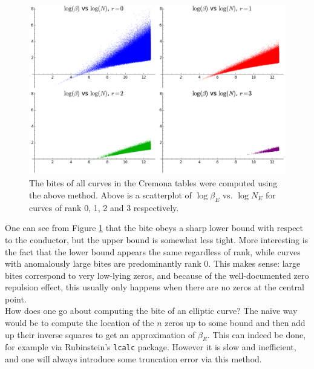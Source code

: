 \begin{figure}[!h]
    \centering
    \includegraphics[width=1.0\textwidth]{graphics/bites_vs_conductors_array.png}
    \caption{The bites of all curves in the Cremona tables were computed using the above method. Above is a scatterplot of $\log \beta_E $ vs. $\log N_E$ for curves of rank 0, 1, 2 and 3 respectively. }
    \label{fig:bites_vs_conductors_array}
\end{figure}

One can see from Figure \ref{fig:bites_vs_conductors_array} that the bite obeys a sharp lower bound with respect to the conductor, but the upper bound is somewhat less tight. More interesting is the fact that the lower bound appears the same regardless of rank, while curves with anomalously large bites are predominantly rank $0$. This makes sense: large bites correspond to very low-lying zeros, and because of the well-documented zero repulsion effect, this usually only happens when there are no zeros at the central point. \\

How does one go about computing the bite of an elliptic curve? The na\"{i}ve way would be to compute the location of the $n$ zeros up to some bound and then add up their inverse squares to get an approximation of $\beta_E$. This can indeed be done, for example via Rubinstein's {\tt lcalc} package. However it is slow and inefficient, and one will always introduce some truncation error via this method.  \\

